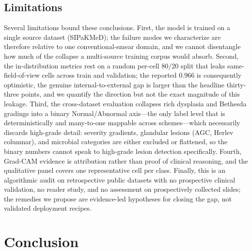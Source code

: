 \subsection{Limitations}

Several limitations bound these conclusions. First, the model is trained on a single source dataset (SIPaKMeD); the failure modes we characterize are therefore relative to one conventional-smear domain, and we cannot disentangle how much of the collapse a multi-source training corpus would absorb. Second, the in-distribution metrics rest on a random per-cell $80/20$ split that leaks same-field-of-view cells across train and validation; the reported $0.966$ is consequently optimistic, the genuine internal-to-external gap is larger than the headline thirty-three points, and we quantify the direction but not the exact magnitude of this leakage. Third, the cross-dataset evaluation collapses rich dysplasia and Bethesda gradings into a binary Normal/Abnormal axis---the only label level that is deterministically and many-to-one mappable across schemes---which necessarily discards high-grade detail: severity gradients, glandular lesions (AGC, Herlev columnar), and microbial categories are either excluded or flattened, so the binary numbers cannot speak to high-grade lesion detection specifically. Fourth, Grad-CAM evidence is attribution rather than proof of clinical reasoning, and the qualitative panel covers one representative cell per class. Finally, this is an algorithmic audit on retrospective public datasets with no prospective clinical validation, no reader study, and no assessment on prospectively collected slides; the remedies we propose are evidence-led hypotheses for closing the gap, not validated deployment recipes.

\section{Conclusion}

